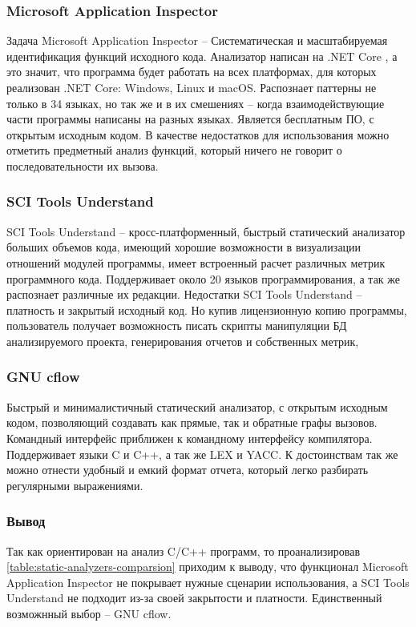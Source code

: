 \subsubsection{Microsoft Application Inspector}\label{sec:ch1/sec3/sub3/sub1}

Задача Microsoft Application Inspector -- Систематическая и масштабируемая идентификация функций исходного кода.
Анализатор написан на .NET Core \autocite{net-core}, а это значит, что программа будет работать на всех платформах,
для которых реализован .NET Core: Windows, Linux и macOS.
Распознает паттерны не только в 34 языках, но так же и в их смешениях -- когда взаимодействующие части программы
написаны на разных языках. Является бесплатным ПО, с открытым исходным кодом.
В качестве недостатков для использования можно отметить предметный анализ функций, который ничего не говорит 
о последовательности их вызова.

\subsubsection{SCI Tools Understand}\label{sec:ch1/sec3/sub3/sub2}
SCI Tools Understand -- кросс-платформенный, быстрый статический анализатор больших объемов кода, имеющий хорошие возможности в 
визуализации отношений модулей программы, имеет встроенный расчет различных метрик программного кода.
Поддерживает около 20 языков программирования, а так же распознает различные их редакции.
Недостатки SCI Tools Understand -- платность и закрытый исходный код. Но купив лицензионную копию
программы, пользователь получает возможность писать скрипты манипуляции БД анализируемого проекта, 
генерирования отчетов и собственных метрик, 

\subsubsection{GNU cflow}\label{sec:ch1/sec3/sub3/sub3}
 Быстрый и минималистичный статический анализатор, с открытым исходным кодом,
 позволяющий создавать как прямые, так и обратные графы вызовов. 
 Командный интерфейс приближен к командному интерфейсу компилятора.
 Поддерживает языки C и C++, а так же LEX и YACC.
 К достоинствам так же можно отнести удобный и емкий формат отчета, который легко
 разбирать регулярными выражениями.

\subsubsection{Вывод}\label{sec:ch1/sec3/sub3/sub4}
Так как {\ProgModule} ориентирован на анализ C/C++ программ, то проанализировав
\autoref{table:static-analyzers-comparsion} приходим к выводу, что функционал 
Microsoft Application Inspector не покрывает нужные сценарии использования, 
а SCI Tools Understand  не подходит из-за своей закрытости и платности.
Единственный возможнный выбор -- GNU cflow. 

